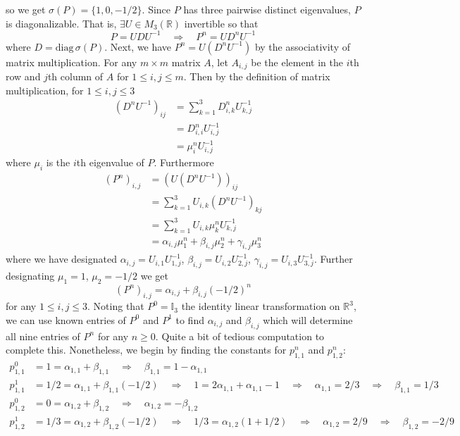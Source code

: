 \documentclass[11pt, letterpaper]{article}
\newcommand{\mbb}[1]{\mathbb{#1}}
\begin{document}
so we get $\sigma(P)=\{1,0,-1/2\}$. Since $P$ has three pairwise distinct eigenvalues, $P$ is diagonalizable. That is, $\exists U\in M_3(\mbb{R})$ invertible so that
\[P=UDU^{-1}\quad\Rightarrow\quad P^n=UD^nU^{-1}\]
where $D=\text{diag}\,\sigma(P)$. Next, we have $P^n=U(D^nU^{-1})$ by the associativity of matrix multiplication. For any $m\times m$ matrix $A$, let $A_{i,j}$ be the element in the $i$th row and $j$th column of $A$ for $1\leq i,j\leq m$.
Then by the definition of matrix multiplication, for $1\leq i,j\leq 3$
\begin{align*}
    (D^nU^{-1})_{ij}&=\sum_{k=1}^3D^n_{i,k}U^{-1}_{k,j}\\
    &=D^n_{i,i}U^{-1}_{i,j}\tag{since $D$ diagonal}\\
    &=\mu_i^nU_{i,j}^{-1}
\end{align*}
where $\mu_i$ is the $i$th eigenvalue of $P$. Furthermore
\begin{align*}
    (P^n)_{i,j}&=(U(D^nU^{-1}))_{ij}\\
    &=\sum_{k=1}^3U_{i,k}(D^nU^{-1})_{kj}\\
    &=\sum_{k=1}^3U_{i,k}\mu^n_kU^{-1}_{k,j}\\
    &=\alpha_{i,j}\mu_1^n+\beta_{i,j}\mu_2^n+\gamma_{i,j}\mu_3^n
\end{align*}
where we have designated $\alpha_{i,j}=U_{i,1}U^{-1}_{1,j}$, $\beta_{i,j}=U_{i,2}U^{-1}_{2,j}$, $\gamma_{i,j}=U_{i,3}U^{-1}_{3,j}$. Further designating $\mu_1=1$, $\mu_2=-1/2$ we get
\[(P^n)_{i,j}=\alpha_{i,j}+\beta_{i,j}(-1/2)^n\]
for any $1\leq i,j\leq 3$. Noting that $P^0=\mbb{I}_3$ the identity linear transformation on $\mbb{R}^3$, we can use known entries of $P^0$ and $P^1$ to find $\alpha_{i,j}$ and $\beta_{i,j}$
which will determine all nine entries of $P^n$ for any $n\geq 0$. Quite a bit of tedious computation to complete this. Nonetheless, we begin by finding the constants for $p_{1,1}^n$ and $p_{1,2}^n$:
\begin{align*}
    p^0_{1,1}&=1=\alpha_{1,1}+\beta_{1,1}\quad\Rightarrow\quad\beta_{1,1}=1-\alpha_{1,1}\tag{6}\\
    p_{1,1}^1&=1/2=\alpha_{1,1}+\beta_{1,1}(-1/2)\quad\Rightarrow\quad 1=2\alpha_{1,1}+\alpha_{1,1}-1\quad\Rightarrow\quad \alpha_{1,1}=2/3\quad\Rightarrow\quad \beta_{1,1}=1/3\\[10pt]
    p_{1,2}^0&=0=\alpha_{1,2}+\beta_{1,2}\quad\Rightarrow\quad \alpha_{1,2}=-\beta_{1,2}\tag{7}\\
    p_{1,2}^1&=1/3=\alpha_{1,2}+\beta_{1,2}(-1/2)\quad\Rightarrow\quad 1/3=\alpha_{1,2}(1+1/2)\quad\Rightarrow\quad\alpha_{1,2}=2/9\quad\Rightarrow\quad\beta_{1,2}=-2/9
\end{align*}
\end{document}
